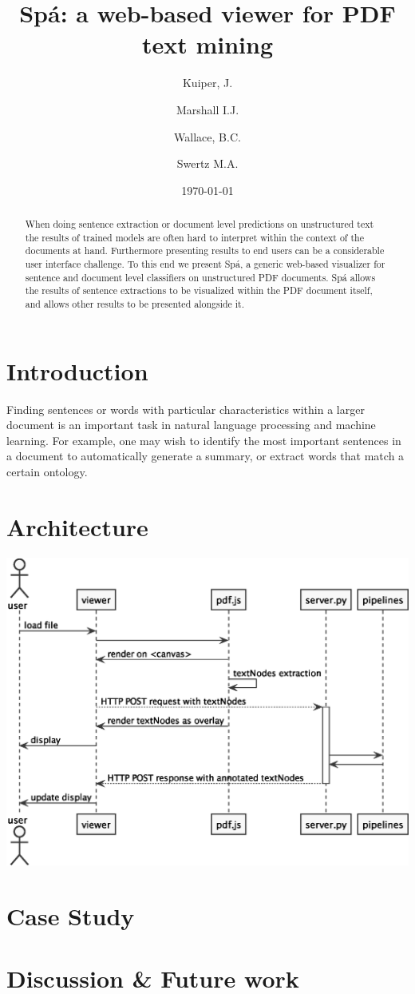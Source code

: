 \documentclass[11pt]{article}
\author{Kuiper, J. \and Marshall I.J. \and Wallace, B.C. \and Swertz M.A.}
\date{\today}
\title{Spá: a web-based viewer for PDF text mining}
\begin{document}
\maketitle
\begin{abstract}
When doing sentence extraction or document level predictions on unstructured text the results of trained models are often hard to interpret within the context of the documents at hand.
Furthermore presenting results to end users can be a considerable user interface challenge.
To this end we present Spá, a generic web-based visualizer for sentence and document level classifiers on unstructured PDF documents.
Spá allows the results of sentence extractions to be visualized within the PDF document itself, and allows other results to be presented alongside it.
\end{abstract}

\section{Introduction}
\label{sec-1}
Finding sentences or words with particular characteristics within a larger document is an important task in natural language processing and machine learning.
For example, one may wish to identify the most important sentences in a document to automatically generate a summary, or extract words that match a certain ontology.
\section{Architecture}
\label{sec-2}
\includegraphics[width=.9\linewidth]{sequence_diagram.eps}
\section{Case Study}
\label{sec-3}
\section{Discussion \& Future work}
\label{sec-4}
\end{document}
